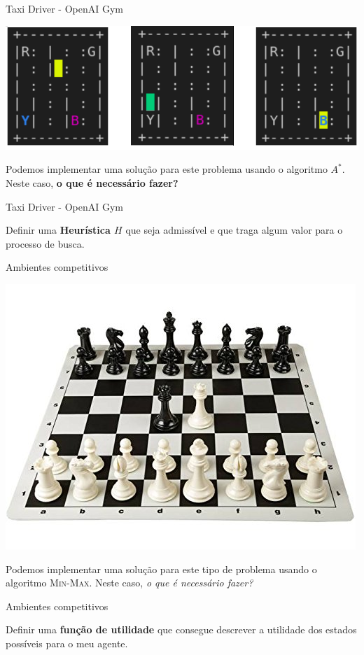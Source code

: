\documentclass{beamer}
\begin{document}
\begin{frame}{Taxi Driver - OpenAI Gym}

	\begin{center}
		\includegraphics[width=.8\textwidth]{figuras/taxi_driver.png}
	\end{center}

	Podemos implementar uma solução para este problema usando o algoritmo $A^{*}$. Neste caso, 
	\textbf{o que é necessário fazer?}

\end{frame}

\begin{frame}{Taxi Driver - OpenAI Gym}

	Definir uma \textbf{Heurística $H$} que seja admissível e que traga algum valor para o 
	processo de busca.

\end{frame}

\begin{frame}{Ambientes competitivos}

	\begin{center}
		\includegraphics[width=.6\textwidth]{figuras/chess.jpg}
	\end{center}

	Podemos implementar uma solução para este tipo de problema usando o algoritmo 
	\textsc{Min-Max}. Neste caso, \emph{o que é necessário fazer?}

\end{frame}

\begin{frame}{Ambientes competitivos}

	Definir uma \textbf{função de utilidade} que consegue descrever a utilidade dos estados possíveis para o meu agente.


\end{frame}
\end{document}
